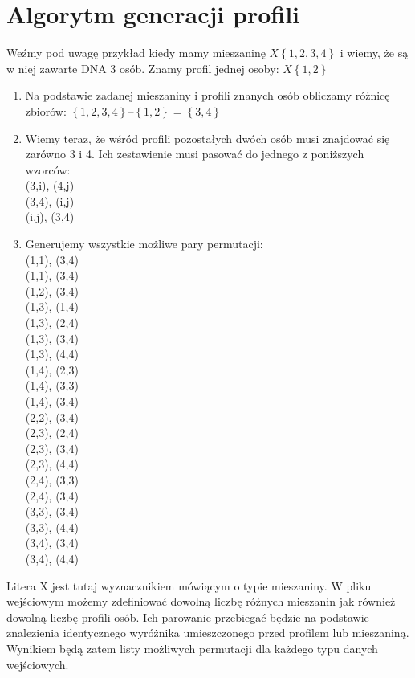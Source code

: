 \documentclass[11pt,a4paper]{article}
\begin{document}
\section{Algorytm generacji profili}
Weźmy pod uwagę przykład kiedy mamy mieszaninę $X\left\{1,2,3,4\right\}$ i wiemy, że są w niej zawarte DNA 3 osób. Znamy profil jednej osoby: $X\left\{1,2\right\}$
\begin{enumerate}
\item Na podstawie zadanej mieszaniny i profili znanych osób obliczamy różnicę zbiorów:
$\left\{1,2,3,4\right\} – \left\{1,2\right\} = \left\{3,4\right\}$
\item Wiemy teraz, że wśród profili pozostałych dwóch osób musi znajdować się zarówno 3 i 4. Ich zestawienie musi pasować do jednego z poniższych wzorców: \\
(3,i), (4,j) \\
(3,4), (i,j) \\
(i,j), (3,4) \\

\item Generujemy wszystkie możliwe pary permutacji: \\
(1,1), (3,4) \\
(1,1), (3,4) \\
(1,2), (3,4) \\
(1,3), (1,4)  \\
(1,3), (2,4) \\
(1,3), (3,4) \\
(1,3), (4,4)  \\
(1,4), (2,3) \\
(1,4), (3,3) \\
(1,4), (3,4)  \\
(2,2), (3,4) \\
(2,3), (2,4)  \\
(2,3), (3,4)  \\
(2,3), (4,4) \\
(2,4), (3,3) \\
(2,4), (3,4)  \\
(3,3), (3,4) \\
(3,3), (4,4)  \\
(3,4), (3,4) \\
(3,4), (4,4) \\
\end{enumerate}

Litera X jest tutaj wyznacznikiem mówiącym o typie mieszaniny. W pliku wejściowym możemy zdefiniować dowolną liczbę różnych mieszanin jak również dowolną liczbę profili osób. Ich parowanie przebiegać będzie na podstawie znalezienia identycznego wyróżnika umieszczonego przed profilem lub mieszaniną. Wynikiem będą zatem listy możliwych permutacji dla każdego typu danych wejściowych.
\end{document}
